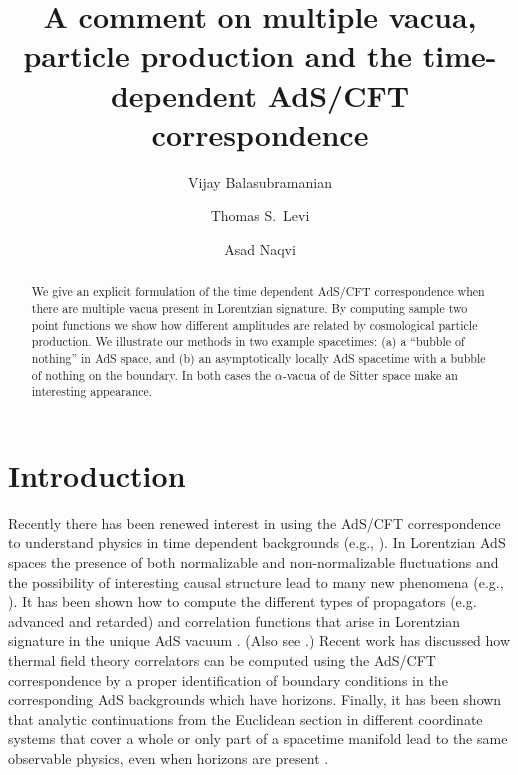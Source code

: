 \documentclass[a4paper,aps,prd,preprintnumbers,groupedaddress]{revtex4}
\begin{document}

\title{A comment on multiple vacua, particle production and the time-dependent AdS/CFT correspondence}

\author{Vijay Balasubramanian}


\author{Thomas S.\ Levi}

\author{Asad Naqvi}

\begin{abstract}
We give an explicit formulation of the time dependent AdS/CFT correspondence when there are multiple vacua present in Lorentzian signature.
By computing sample two point functions we show how different amplitudes are related by cosmological particle production.  We illustrate our methods in two example spacetimes: (a) a ``bubble of nothing''  in AdS space, and (b) an asymptotically locally AdS spacetime with a bubble of nothing on the boundary.  In both cases the $\alpha$-vacua of de Sitter space make an interesting appearance.
\end{abstract}


\pacs{}

\maketitle

\section{Introduction}
Recently there has been renewed interest in using the AdS/CFT correspondence to understand physics in time dependent backgrounds (e.g., \cite{adstime,birm,vijayross,son02,herzog02,danielsson,esko,troost02,kraus02}).
In  Lorentzian AdS spaces the presence of both normalizable and non-normalizable fluctuations and the possibility of interesting causal structure  lead to many new phenomena (e.g., \cite{vijay981,vijay982,banks98,vijay99,giddings99,danielsson,esko,AdSbh}).  It has been shown how to compute the different types of propagators  (e.g. advanced and retarded) and correlation functions that arise in Lorentzian signature in the unique AdS vacuum \cite{danielsson,esko}.  (Also see   \cite{troost02}.)   Recent work has discussed how thermal field theory correlators can be computed using the AdS/CFT correspondence by a proper identification of boundary conditions in the corresponding AdS backgrounds which have horizons\cite{son02,herzog02}.    Finally, it has been shown that analytic continuations from the Euclidean section in different coordinate systems that cover a whole or only part of a spacetime
manifold lead to the same observable physics, even when horizons are present \cite{kraus02}.
\end{document}

